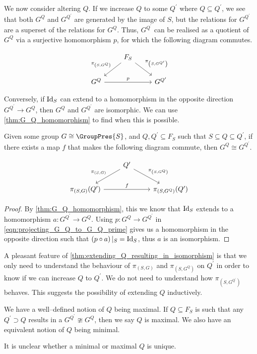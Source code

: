 We now consider altering $Q$.
If we increase $Q$ to some $Q^\prime$ where $Q \subseteq Q^\prime$, we see that both $G^Q$ and $G^{Q^\prime}$ are generated by the image of $S$, but the relations for $G^{Q^\prime}$ are a superset of the relations for $G^Q$.
Thus, $G^{Q^\prime}$ can be realised as a quotient of $G^Q$ via a surjective homomorphism $p$, for which the following diagram commutes.

\begin{equation}
	\begin{tikzcd}
		& F_S \ar[dl, "\pi_{\left( S, G^Q \right) }"'] \ar[dr, "\pi_{\left( S, G^{Q^\prime} \right) }"] &
		\\ G^Q \ar[rr, "p"] & & G^{Q^\prime}
	\end{tikzcd}
	\label{eqn:projecting_G_Q_to_G_Q_prime}
\end{equation}

Conversely, if $\operatorname{Id}_S$ can extend to a homomorphism in the opposite direction $G^{Q^\prime} \to G^Q$, then $G^Q$ and $G^{Q^\prime}$ are isomorphic.
We can use \cref{thm:G_Q_homomorphism} to find when this is possible.

\begin{theorem}
	Given some group $G \cong \GroupPres{S}$, and $Q, Q^\prime \subseteq F_S$ such that $S \subseteq Q \subseteq Q^\prime$, if there exists a map $f$ that makes the following diagram commute, then $G^Q \cong G^{Q^\prime}$.

	\begin{equation*}
		\begin{tikzcd}
			& Q^\prime \ar[dl, "\pi_{\left( S, G \right) }"'] \ar[dr, "\pi_{\left( S, G^Q \right) }"] &
			\\ \pi_{\left( S, G \right) }(Q^\prime) \ar[rr, "f"] & & \pi_{\left( S,G^Q \right) }(Q^\prime)
		\end{tikzcd}
	\end{equation*}
	\label{thm:extending_Q_resulting_in_isomorphism}
\end{theorem}

\begin{proof}
	By \cref{thm:G_Q_homomorphism}, this we know that $\operatorname{Id}_S$ extends to a homomorphism $a \colon G^{Q^\prime} \to G^Q$.
	Using $p \colon G^Q \to G^{Q^\prime}$ in \eqref{eqn:projecting_G_Q_to_G_Q_prime} gives us a homomorphism in the opposite direction such that $\left(p \circ a \right) |_S = \operatorname{Id}_S$, thus $a$ is an isomorphism.
\end{proof}

A pleasant feature of \cref{thm:extending_Q_resulting_in_isomorphism} is that we only need to understand the behaviour of $\pi_{\left( S,G \right) }$ and $\pi_{\left( S, G^Q \right) }$ on $Q^\prime$ in order to know if we can increase $Q$ to $Q^\prime$.
We do not need to understand how $\pi_{\left(S,G^{Q^\prime}\right)}$ behaves.
This suggests the possibility of extending $Q$ inductively.

We have a well--defined notion of $Q$ being maximal.
If  $Q \subseteq F_S$ is such that any $Q^\prime \supset Q$ results in a $G^{Q^\prime} \ncong G^Q$, then we say $Q$ is maximal.
We also have an equivalent notion of $Q$ being minimal.

It is unclear whether a minimal or maximal $Q$ is unique.
